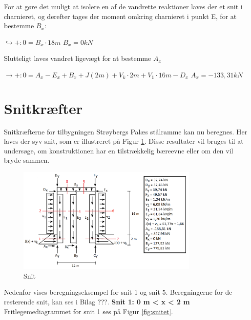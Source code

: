 For at gøre det muligt at isolere en af de vandrette reaktioner laves der et snit i charnieret, og derefter tages der moment omkring charnieret i punkt E, for at bestemme $B_x$:
\begin{center}
	$\hookrightarrow+: 0 = B_x \cdot 18m$
	\newline
	$B_x = 0 kN$
\end{center}

Slutteligt laves vandret ligevægt for at bestemme $A_x$
\begin{center}
	$\rightarrow+: 0 = A_x - E_x + B_x + J(2m) + V_k \cdot 2m + V_1 \cdot 16 m - D_x$
	\newline
	$A_x = -133,\!31 kN$
\end{center} 

\section{Snitkræfter}
Snitkræfterne for tilbygningen Strøybergs Palæs stålramme kan nu beregnes. Her laves der syv snit, som er illustreret på Figur \ref{fig:snitbrud}. Disse resultater vil bruges til at undersøge, om konstruktionen har en tilstrækkelig bæreevne eller om den vil bryde sammen. 

\begin{figure}[H]
	\centering
	\includegraphics[width=0.8\textwidth]{billeder/snitbrud.png}
	\caption{Snit}
	\label{fig:snitbrud}
\end{figure}

Nedenfor vises beregningseksempel for snit 1 og snit 5. Beregningerne for de resterende snit, kan ses i Bilag ???. 
\newline
\newline
\textbf{Snit 1: 0 m < x < 2 m}
\newline
Fritlegemediagrammet for snit 1 ses på Figur \ref{fig:snitet}.

